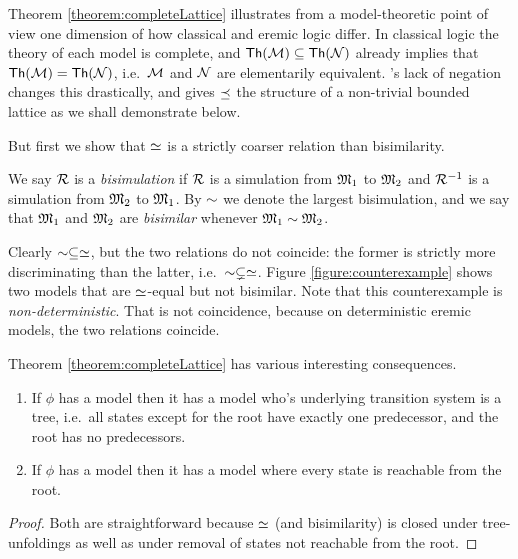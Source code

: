 Theorem \ref{theorem:completeLattice} illustrates from a
model-theoretic point of view one dimension of how classical and
eremic logic differ. In classical logic the theory of each model is
complete, and $\mathsf{Th}(\mathcal{M}) \subseteq \mathsf{Th}(\mathcal{N})$ already
implies that $\mathsf{Th}(\mathcal{M}) = \mathsf{Th}(\mathcal{N})$, i.e.~$\mathcal{M}$ and
$\mathcal{N}$ are elementarily equivalent. \ELFULL{}'s lack of negation
changes this drastically, and gives $\preceq$ the structure of a
non-trivial bounded lattice as we shall demonstrate below.

But first we show that $\simeq$ is a strictly coarser relation than 
bisimilarity.

\begin{definition}
We say $\mathcal{R}$ is a \emph{bisimulation} if $\mathcal{R}$ is a simulation from
$\frak{M}_1$ to $\frak{M}_2$ and $\mathcal{R}^{-1}$ is a simulation from $\frak{M}_2$ to
$\frak{M}_1$. By $\sim$ we denote the largest bisimulation, and we say
that $\frak{M}_1$ and $\frak{M}_2$ are \emph{bisimilar} whenever $\frak{M}_1
\sim \frak{M}_2$.
\end{definition}

Clearly $\sim \subseteq \simeq$, but the two relations do not
coincide: the former is strictly more discriminating than the latter,
i.e.~$\sim \subsetneq \simeq$. Figure \ref{figure:counterexample}
shows two models that are $\simeq$-equal but not bisimilar. Note
that this counterexample is \emph{non-deterministic}. That is not
coincidence, because on deterministic eremic models, the two relations
coincide.



Theorem \ref{theorem:completeLattice} has various interesting
consequences.

\begin{corollary}
\begin{enumerate}

\item If $\phi$ has a model then it has a model who's underlying
  transition system is a tree, i.e.~all states except for the root
  have exactly one predecessor, and the root has no predecessors.

\item If $\phi$ has a model then it has a model where every state is
  reachable from the root.

\end{enumerate}
\end{corollary}
\begin{proof}
Both are straightforward because $\simeq$ (and bisimilarity) is
closed under tree-unfoldings as well as under removal of states not
reachable from the root.
\end{proof}


